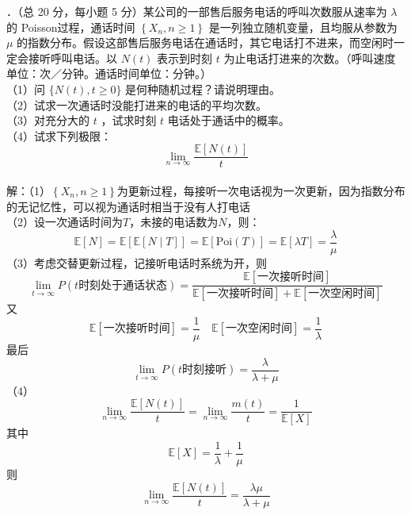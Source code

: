 \documentclass[UTF8,openany]{book}
\begin{document}
．（总 20 分，每小题 5 分）某公司的一部售后服务电话的呼叫次数服从速率为 $\lambda$ 的 Poisson过程，通话时间 $\left\{X_{n}, n \geqslant 1\right\}$ 是一列独立随机变量，且均服从参数为 $\mu$ 的指数分布。假设这部售后服务电话在通话时，其它电话打不进来，而空闲时一定会接听呼叫电话。以 $N(t)$ 表示到时刻 $t$ 为止电话打进来的次数。（呼叫速度单位：次／分钟。通话时间单位：分钟。）\\
（1）问 $\{N(t), t \geqslant 0\}$ 是何种随机过程？请说明理由。\\
（2）试求一次通话时没能打进来的电话的平均次数。\\
（3）对充分大的 $t$ ，试求时刻 $t$ 电话处于通话中的概率。\\
（4）试求下列极限：
$$
\lim _{n \rightarrow \infty} \frac{\mathbb{E}[N(t)]}{t}
$$\\
解：（1）$\left\{X_{n}, n \geqslant 1\right\}$为更新过程，每接听一次电话视为一次更新，因为指数分布的无记忆性，可以视为通话时相当于没有人打电话\\
（2）设一次通话时间为$T$，未接的电话数为$N$，则：
\[
\mathbb{E}[N]=\mathbb{E}\left[\mathbb{E}[N\mid T] \right]=\mathbb{E}[\mathrm{Poi}(T)]=\mathbb{E}\left[\lambda T \right]  =\frac{\lambda}{\mu}
\]
（3）考虑交替更新过程，记接听电话时系统为开，则
\[
\lim_{t\rightarrow \infty}P(t\text{时刻处于通话状态})=\frac{\mathbb{E}\left[\text{一次接听时间} \right] }{\mathbb{E}\left[\text{一次接听时间} \right]+\mathbb{E}\left[\text{一次空闲时间} \right]}
\]
又
\[
\mathbb{E}\left[\text{一次接听时间} \right]=\frac{1}{\mu} \quad \mathbb{E}\left[\text{一次空闲时间}\right] =\frac{1}{\lambda}
\]
最后
\[
\lim_{t\rightarrow \infty}P(t\text{时刻接听})=\frac{\lambda}{\lambda+\mu}
\]
（4）
$$
\lim _{n \rightarrow \infty} \frac{\mathbb{E}[N(t)]}{t}=\lim _{n \rightarrow \infty} \frac{m(t)}{t}=\frac{1}{\mathbb{E}[X]}
$$
其中
\[
\mathbb{E}[X]=\frac{1}{\lambda}+\frac{1}{\mu}
\]
则
\[
\lim _{n \rightarrow \infty} \frac{\mathbb{E}[N(t)]}{t}=\frac{\lambda \mu}{\lambda+\mu}
\]\\
\end{document}
